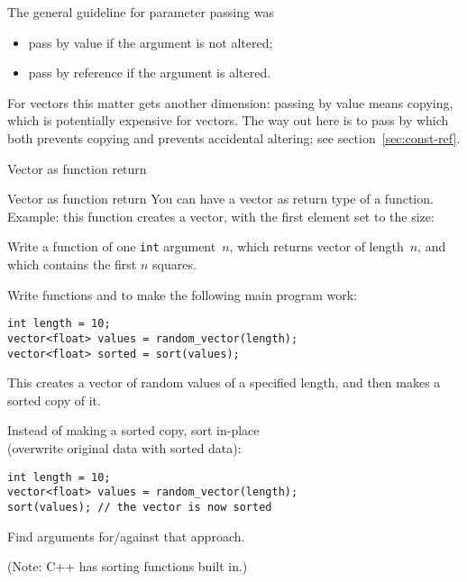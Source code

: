 The general guideline for parameter passing was
\begin{itemize}
\item pass by value if the argument is not altered;
\item pass by reference if the argument is altered.
\end{itemize}
For vectors this matter gets another dimension:
passing by value means copying, which is potentially expensive for vectors.
The way out here is to pass by 
which both prevents copying and prevents accidental altering;
see section~\ref{sec:const-ref}.

 {Vector as function return}

\begin{block}{Vector as function return}
  \label{sl:vector-return}
  You can have a vector as return type of a function.\\
  Example: this function
  creates a vector, with the first element set to the size:
\end{block}

\begin{exercise}
  \label{ex:vec-of-squares}
  Write a function of one \lstinline{int} argument~$n$, which returns vector
  of length~$n$, and which contains the first $n$ squares.
\end{exercise}

\begin{exercise}
  \label{ex:vec-rand-sort}
  Write functions  and  to make the following
  main program work:
\begin{lstlisting}
int length = 10;
vector<float> values = random_vector(length);
vector<float> sorted = sort(values);
\end{lstlisting}
  This creates a vector of random values of a specified length, and
  then makes a sorted copy of it.

  Instead of making a sorted copy, sort in-place\\
  (overwrite original data with sorted data):
\begin{lstlisting}
int length = 10;
vector<float> values = random_vector(length);
sort(values); // the vector is now sorted
\end{lstlisting}
  Find
  arguments for/against that approach.

  (Note: C++ has sorting functions built in.)
\end{exercise}

